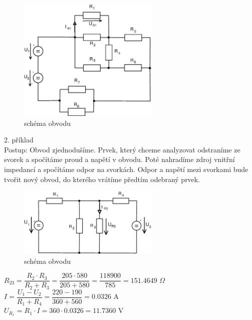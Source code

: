 \documentclass[10pt,a4paper]{article}
\begin{document}
\begin{figure}[ht]
    \begin{center}
     \includegraphics[width=0.6\textwidth]{2017.eps}
     \caption{schéma obvodu}
    \end{center}
   \end{figure}  
   \newpage
   
    \begin{flushleft}
    {\large 2. příklad}
    \\[10pt]
    Postup: Obvod zjednodušíme. Prvek, který chceme analyzovat odstraníme ze svorek a spočítáme proud a napětí v obvodu. Poté nahradíme zdroj vnitřní impedancí a spočítáme odpor na svorkách. Odpor a napětí mezi svorkami bude tvořit nový obvod, do kterého vrátíme předtím odebraný prvek.
    \\[15pt]
    \end{flushleft}
   
   \begin{figure}[ht]
    \begin{center}
     \includegraphics[width=0.6\textwidth]{2022.eps}
     \caption{schéma obvodu}
    \end{center}
   \end{figure}   
    
   
  \begin{center}
   \begin{large}
   $ R_{23} = \dfrac{R_2 \cdot R_3}{R_2 + R_3} = \dfrac{205 \cdot 580}{205 + 580} = \dfrac{118900}{785} = 151.4649$ $\Omega $
   \\[6pt]
   $ I = \dfrac{U_1 - U_2}{R_1 + R_4} = \dfrac{220 - 190}{360 + 560} = 0.0326 $ A
   \\[6pt]
   $ U_{R_{1}} = R_{1} \cdot I = 360 \cdot 0.0326 = 11.7360  $ V
   \\[20pt]  
   \end{large}
  \end{center}
\end{document}
